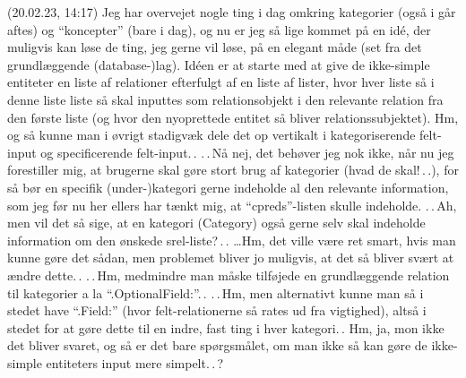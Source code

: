 \documentclass{report}
\begin{document}
(20.02.23, 14:17) Jeg har overvejet nogle ting i dag omkring kategorier (også i går aftes) og ``koncepter'' (bare i dag), og nu er jeg så lige kommet på en idé, der muligvis kan løse de ting, jeg gerne vil løse, på en elegant måde (set fra det grundlæggende (database-)lag). Idéen er at starte med at give de ikke-simple entiteter en liste af relationer efterfulgt af en liste af lister, hvor hver liste så i denne liste liste så skal inputtes som relationsobjekt i den relevante relation fra den første liste (og hvor den nyoprettede entitet så bliver relationssubjektet). Hm, og så kunne man i øvrigt stadigvæk dele det op vertikalt i kategoriserende felt-input og specificerende felt-input.\,. .\,.\,Nå nej, det behøver jeg nok ikke, når nu jeg forestiller mig, at brugerne skal gøre stort brug af kategorier (hvad de skal!\,.\,.), for så bør en specifik (under-)kategori gerne indeholde al den relevante information, som jeg før nu her ellers har tænkt mig, at ``cpreds''-listen skulle indeholde. .\,.\,Ah, men vil det så sige, at en kategori (Category) også gerne selv skal indeholde information om den ønskede srel-liste?\,.\,. 
\ldots Hm, det ville være ret smart, hvis man kunne gøre det sådan, men problemet bliver jo muligvis, at det så bliver svært at ændre dette.\,. .\,.\,Hm, medmindre man måske tilføjede en grundlæggende relation til kategorier a la ``.OptionalField:''.\,. .\,.\,Hm, men alternativt kunne man så i stedet have ``.Field:'' (hvor felt-relationerne så rates ud fra vigtighed), altså i stedet for at gøre dette til en indre, fast ting i hver kategori.\,. Hm, ja, mon ikke det bliver svaret, og så er det bare spørgsmålet, om man ikke så kan gøre de ikke-simple entiteters input mere simpelt.\,.\,? 
\end{document}
